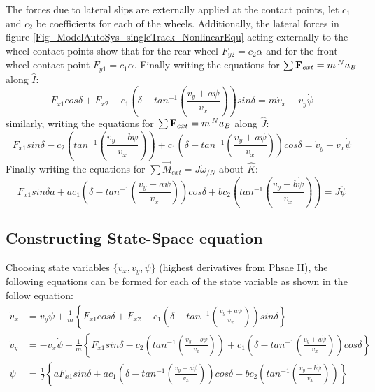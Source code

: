 The forces due to lateral slips are externally applied at the contact points, let $c_1$ and $c_2$ be coefficients for each of the wheels. Additionally, the lateral forces in figure \ref{Fig_ModelAutoSys_singleTrack_NonlinearEqu} acting externally to the wheel contact points show that for the rear wheel $F_{y2} = c_{2}\alpha$ and for the front wheel contact point  $F_{y1} = c_{1}\alpha$. Finally writing the equations for $	\sum \vec{F}_{ext} = m \prescript{N}{}{a}_{B}$ along $\hat{I}$:
\begin{equation}
		F_{x1}cos\delta + F_{x2} - c_{1}\left(\delta - tan^{-1}\left(\frac{v_y + a\dot{\psi}}{v_x}\right)\right)sin\delta = m \dot{v}_x - v_y \dot{\psi}
\end{equation}
similarly, writing the equations for $	\sum \vec{F}_{ext} = m \prescript{N}{}{a}_{B}$ along $\hat{J}$:
\begin{equation}
	F_{x1}sin\delta - c_{2}\left(tan^{-1}\left(\frac{v_y - b \dot{\psi}}{v_x}\right)\right) + c_{1}\left(\delta - tan^{-1}\left(\frac{v_y + a\psi}{v_x}\right)\right)cos\delta = \dot{v}_y + v_x \dot{\psi}
\end{equation}
Finally writing the equations for $	\sum \vec{M}_{ext} = J \dot{\omega}_{/N}$ about $\hat{K}$:
\begin{equation}
	F_{x1} sin\delta a + a c_{1}\left(\delta - tan^{-1}\left(\frac{v_y + a\psi}{v_x}\right)\right)cos\delta + b c_{2}\left(tan^{-1}\left(\frac{v_y - b \dot{\psi}}{v_x}\right)\right) = J \ddot{\psi}
\end{equation}

\subsection{Constructing State-Space equation}
Choosing state variables $\{v_x, v_y, \dot{\psi}\}$ (highest derivatives from Phsae II), the following equations can be formed for each of the state variable as shown in the follow equation:
\begin{align}
	\dot{v}_x &= v_y \dot{\psi} + \frac{1}{m}\left\{ F_{x1}cos\delta + F_{x2} - c_{1}\left(\delta - tan^{-1}\left(\frac{v_y + a\dot{\psi}}{v_x}\right)\right)sin\delta \right\} \label{eq_2_ch_3_BicycleModel_VX} \\
	\dot{v}_y &= -v_x \dot{\psi} + \frac{1}{m} \left\{ F_{x1}sin\delta - c_{2}\left(tan^{-1}\left(\frac{v_y - b \dot{\psi}}{v_x}\right)\right) + c_{1}\left(\delta - tan^{-1}\left(\frac{v_y + a\dot{\psi}}{v_x}\right)\right)cos\delta \right\} \label{eq_2_ch_3_BicycleModel_VY} \\
	\ddot{\psi} &= \frac{1}{J} \left\{a	F_{x1} sin\delta + a c_{1}\left(\delta - tan^{-1}\left(\frac{v_y + a\dot{\psi}}{v_x}\right)\right)cos\delta + b c_{2}\left(tan^{-1}\left(\frac{v_y - b \dot{\psi}}{v_x}\right)\right) \right\} \label{eq_2_ch_3_BicycleModel_MZ}
\end{align}

